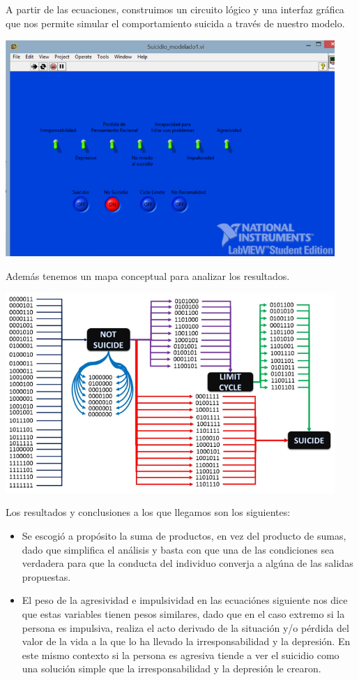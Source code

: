 {{{{{A partir de las ecuaciones, construimos un circuito lógico y una interfaz gráfica que nos permite simular el comportamiento suicida a través de nuestro modelo.

\begin{center}
\includegraphics[width=12.5cm]{imagenes/1-suicidio/labview.png}
\end{center}
Además tenemos un mapa conceptual para analizar los resultados.
\begin{center}
\includegraphics[width=12.5cm]{imagenes/1-suicidio/mapa.png}
\end{center}
Los resultados y conclusiones a los que llegamos son los siguientes:
\begin{itemize}
\item Se escogió a propósito la suma de productos, en vez del producto de sumas, dado que simplifica el análisis y basta con que una de las condiciones sea verdadera para que la conducta del individuo converja a algúna de las salidas propuestas.
\item El peso de la agresividad e impulsividad en las ecuaciónes siguiente nos dice que estas variables tienen pesos similares, dado que en el caso extremo si la persona es impulsiva, realiza el acto derivado de la situación y/o pérdida del valor de la vida a la que lo ha llevado la irresponsabilidad y la depresión. En este mismo contexto si la persona es agresiva tiende a ver el suicidio como una solución simple que la irresponsabilidad y la depresión le crearon.\\

\end{itemize}}}}}}

